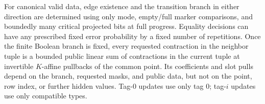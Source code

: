 \begin{lemma}
\label{ia:evolution}
For canonical valid data, edge existence and the transition branch
in either direction are determined using only mode, empty/full
marker comparisons, and boundedly many critical projected bits at
full progress.  Equality decisions can have any prescribed fixed
error probability by a fixed number of repetitions.  Once the
finite Boolean branch is fixed, every requested contraction in the
neighbor tuple is a bounded public linear sum of contractions in
the current tuple at invertible $K$-affine pullbacks of the common
point.  Its coefficients and slot pulls depend on the branch,
requested masks, and public data, but not on the point, row index,
or further hidden values.  Tag-$0$ updates use only tag $0$;
tag-$i$ updates use only compatible types.
\end{lemma}

